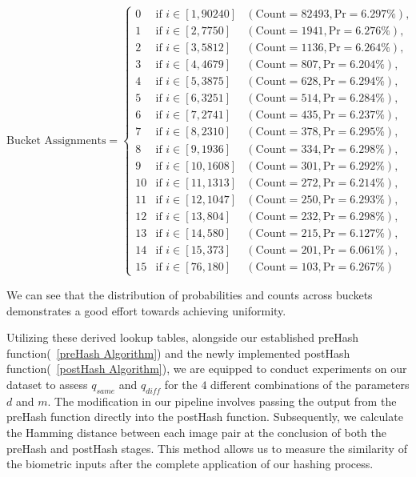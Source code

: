 \renewcommand{\arraystretch}{1.25}
\[
\text{Bucket Assignments} = \left\{
\begin{array}{lll}
    0 & \text{if } i \in [1, 90240] & (\text{Count} = 82493, \text{Pr} = 6.297\%), \\
    1 & \text{if } i \in [2, 7750] & (\text{Count} = 1941, \text{Pr} = 6.276\%), \\
    2 & \text{if } i \in [3, 5812] & (\text{Count} = 1136, \text{Pr} = 6.264\%), \\
    3 & \text{if } i \in [4, 4679] & (\text{Count} = 807, \text{Pr} = 6.204\%), \\
    4 & \text{if } i \in [5, 3875] & (\text{Count} = 628, \text{Pr} = 6.294\%), \\
    5 & \text{if } i \in [6, 3251] & (\text{Count} = 514, \text{Pr} = 6.284\%), \\
    6 & \text{if } i \in [7, 2741] & (\text{Count} = 435, \text{Pr} = 6.237\%), \\
    7 & \text{if } i \in [8, 2310] & (\text{Count} = 378, \text{Pr} = 6.295\%), \\
    8 & \text{if } i \in [9, 1936] & (\text{Count} = 334, \text{Pr} = 6.298\%), \\
    9 & \text{if } i \in [10, 1608] & (\text{Count} = 301, \text{Pr} = 6.292\%), \\
    10 & \text{if } i \in [11, 1313] & (\text{Count} = 272, \text{Pr} = 6.214\%), \\
    11 & \text{if } i \in [12, 1047] & (\text{Count} = 250, \text{Pr} = 6.293\%), \\
    12 & \text{if } i \in [13, 804] & (\text{Count} = 232, \text{Pr} = 6.298\%), \\
    13 & \text{if } i \in [14, 580] & (\text{Count} = 215, \text{Pr} = 6.127\%), \\
    14 & \text{if } i \in [15, 373] & (\text{Count} = 201, \text{Pr} = 6.061\%), \\
    15 & \text{if } i \in [76, 180] & (\text{Count} = 103, \text{Pr} = 6.267\%)
\end{array}
\right.
\]


We can see that the distribution of probabilities and counts across buckets demonstrates a good effort towards achieving uniformity.

Utilizing these derived lookup tables, alongside our established preHash function(~\ref{preHash Algorithm}) and the newly implemented postHash function(~\ref{postHash Algorithm}), we are equipped to conduct experiments on our dataset to assess \(q_{same}\) and \(q_{diff}\) for the \(4\) different combinations of the parameters \(d\) and \(m\). The modification in our pipeline involves passing the output from the preHash function directly into the postHash function. Subsequently, we calculate the Hamming distance between each image pair at the conclusion of both the preHash and postHash stages. This method allows us to measure the similarity of the biometric inputs after the complete application of our hashing process.


